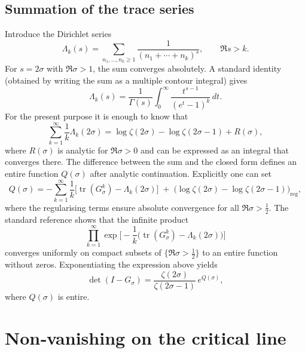 \documentclass{article}
\theoremstyle{definition}
\theoremstyle{remark}
\DeclareMathOperator{\tr}{tr}
\DeclareMathOperator{\Det}{\det}
\begin{document}
\subsection{Summation of the trace series}
Introduce the Dirichlet series
\[
\Lambda_{k}(s)=\sum_{n_{1},\dots,n_{k}\ge 1}\frac{1}{(n_{1}+\cdots+n_{k})^{s}},
\qquad \Re s>k.
\]
For \(s=2\sigma\) with \(\Re\sigma>1\), the sum converges absolutely.
A standard identity (obtained by writing the sum as a multiple contour
integral) gives
\[
\Lambda_{k}(s)=\frac{1}{\Gamma(s)}\int_{0}^{\infty}
\frac{t^{s-1}}{(e^{t}-1)^{k}}\,dt .
\]
For the present purpose it is enough to know that
\[
\sum_{k=1}^{\infty}\frac{1}{k}\Lambda_{k}(2\sigma)
= \log\zeta(2\sigma)-\log\zeta(2\sigma-1)+R(\sigma),
\]
where \(R(\sigma)\) is analytic for \(\Re\sigma>0\) and can be expressed
as an integral that converges there.  The difference between the sum
and the closed form defines an entire function \(Q(\sigma)\) after
analytic continuation.  Explicitly one can set
\[
Q(\sigma)= -\sum_{k=1}^{\infty}\frac{1}{k}
\bigl[\tr(G_{\sigma}^{k})-\Lambda_{k}(2\sigma)\bigr]
\;+\; \bigl(\log\zeta(2\sigma)-\log\zeta(2\sigma-1)\bigr)_{\mathrm{reg}},
\]
where the regularising terms ensure absolute convergence for all
\(\Re\sigma>\frac12\).  The standard reference \cite{Mayer91} shows
that the infinite product
\[
\prod_{k=1}^{\infty}\exp\!\Big[-\frac{1}{k}\bigl(\tr(G_{\sigma}^{k})
-\Lambda_{k}(2\sigma)\bigr)\Big]
\]
converges uniformly on compact subsets of \(\{\Re\sigma>\frac12\}\)
to an entire function without zeros.  Exponentiating the expression
above yields
\[
\Det(I-G_{\sigma}) = \frac{\zeta(2\sigma)}{\zeta(2\sigma-1)}\,
e^{Q(\sigma)},
\]
where \(Q(\sigma)\) is entire.

\section{Non‑vanishing on the critical line}
\end{document}
